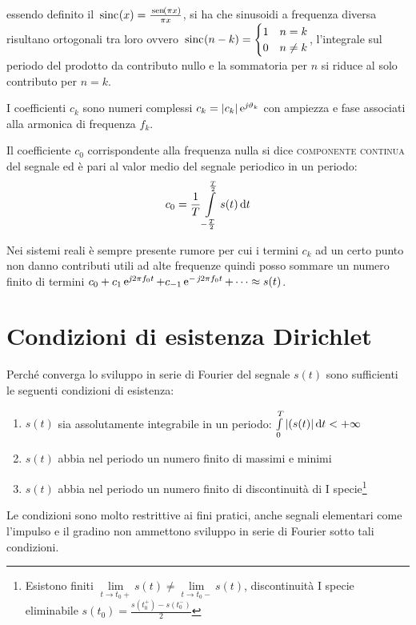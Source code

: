 essendo definito il $\,{\operatorname{sinc}}^{}\!\left({x}\right)=\frac{\,{\operatorname{sen}}^{}\!\left({\pi x}\right)}{\pi x}$, si ha che sinusoidi a frequenza diversa risultano ortogonali tra loro ovvero $\,{\operatorname{sinc}}^{}\!\left({n-k}\right)=\begin{cases}
1 & n=k \\ 0 & n\neq k\end{cases}$, l'integrale sul periodo del prodotto da contributo nullo e la sommatoria per $n$ si riduce al solo contributo per $n=k$.

I coefficienti $c_k$ sono numeri complessi $c_k=\left|{c_k}\right|\operatorname{e}^{\operatorname{\mathit{j}\!}\vartheta_k}$ con ampiezza e fase associati alla armonica di frequenza $f_k$.

Il coefficiente $c_0$ corrispondente alla frequenza nulla si dice \textsc{componente continua} del segnale ed è pari al valor medio del segnale periodico in un periodo:
\begin{equation}c_0=\frac{1}{T}\int\limits_{-\frac{T}{2}}^{\frac{T}{2}}{s(t)}{\,\mathop{}\!\mathrm{d}{t}} \end{equation}

\begin{nota}Nei sistemi reali è sempre presente rumore per cui i termini $c_k$ ad un certo punto non danno contributi utili ad alte frequenze quindi posso sommare un numero finito di termini $c_0 + c_1\operatorname{e}^{\operatorname{\mathit{j}\!} 2\pi f_0 t}+c_{-1}\operatorname{e}^{-\operatorname{\mathit{j}\!} 2\pi f_0 t}+\dots\approx s(t)$.\end{nota}

\section{Condizioni di esistenza Dirichlet}
Perché converga lo sviluppo in serie di Fourier del segnale $s(t)$ sono sufficienti le seguenti condizioni di esistenza:
\begin{enumerate}
\item $s(t)$ sia assolutamente integrabile in un periodo: $\int\limits_{0}^{T}{\left|{(s(t)}\right|}{\,\mathop{}\!\mathrm{d}{t}}<+\infty$
\item $s(t)$ abbia nel periodo un numero finito di massimi e minimi
\item $s(t)$ abbia nel periodo un numero finito di discontinuità di I specie\footnote{Esistono finiti $\lim\limits_{t\to t_0+}s(t)\neq\lim\limits_{t\to t_0-}s(t)$, discontinuità I specie eliminabile $s(t_0)=\frac{s(t_0^+)-s(t_0^-)}{2}$}
\end{enumerate}
\begin{nota}Le condizioni sono molto restrittive ai fini pratici, anche segnali elementari come l'impulso e il gradino non ammettono sviluppo in serie di Fourier sotto tali condizioni.\end{nota}


